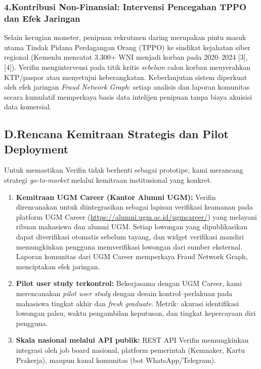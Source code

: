 \documentclass[12pt,a4paper]{article}
\begin{document}
\begin{blokkuning}
\subsubsection*{4.\quad Kontribusi Non-Finansial: Intervensi Pencegahan TPPO dan Efek Jaringan}
Selain kerugian moneter, penipuan rekrutmen daring merupakan pintu masuk utama Tindak Pidana Perdagangan Orang (TPPO)
ke sindikat kejahatan siber regional (Kemenlu mencatat 3.300+ WNI menjadi korban pada 2020--2024 [3], [4]). Verifin
mengintervensi pada titik kritis \textit{sebelum} calon korban menyerahkan KTP/paspor atau menyetujui keberangkatan.
Keberlanjutan sistem diperkuat oleh efek jaringan \textit{Fraud Network Graph}: setiap analisis dan laporan komunitas
secara kumulatif memperkaya basis data intelijen penipuan tanpa biaya akuisisi data komersial.

\subsection*{D.\quad Rencana Kemitraan Strategis dan Pilot Deployment}

Untuk memastikan Verifin tidak berhenti sebagai prototipe, kami merancang strategi
\textit{go-to-market} melalui kemitraan institusional yang konkret.

\begin{enumerate}[label=\textbf{\arabic*.}]
\item \textbf{Kemitraan UGM Career (Kantor Alumni UGM):} Verifin direncanakan untuk diintegrasikan
sebagai lapisan verifikasi keamanan pada platform UGM Career
(\url{https://alumni.ugm.ac.id/ugmcareer/}) yang melayani ribuan mahasiswa dan alumni UGM.
Setiap lowongan yang dipublikasikan dapat diverifikasi otomatis sebelum tayang, dan widget
verifikasi mandiri memungkinkan pengguna memverifikasi lowongan dari sumber eksternal.
Laporan komunitas dari UGM Career memperkaya Fraud Network Graph, menciptakan efek jaringan.

\item \textbf{Pilot user study terkontrol:} Bekerjasama dengan UGM Career, kami merencanakan
\textit{pilot user study} dengan desain kontrol--perlakuan pada mahasiswa tingkat akhir
dan \textit{fresh graduate}. Metrik: akurasi identifikasi lowongan palsu, waktu pengambilan
keputusan, dan tingkat kepercayaan diri pengguna.

\item \textbf{Skala nasional melalui API publik:} REST API Verifin memungkinkan integrasi oleh
job board nasional, platform pemerintah (Kemnaker, Kartu Prakerja), maupun kanal komunitas
(bot WhatsApp/Telegram).
\end{enumerate}


\end{blokkuning}
\end{document}
